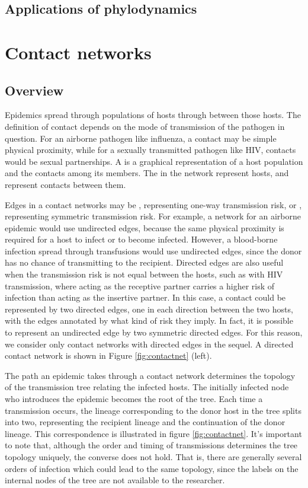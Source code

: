 \subsection{Applications of phylodynamics}
\label{subsubsec:appphylo}

\section{Contact networks}
\label{subsec:contactnet}

\subsection{Overview}

Epidemics spread through populations of hosts through  between
those hosts. The definition of contact depends on the mode of transmission of
the pathogen in question. For an airborne pathogen like influenza, a contact
may be simple physical proximity, while for a sexually transmitted pathogen
like HIV, contacts would be sexual partnerships. A  is a
graphical representation of a host population and the contacts among its
members. The  in the network represent hosts, and 
represent contacts between them. 

Edges in a contact networks may be , representing one-way
transmission risk, or , representing symmetric transmission
risk. For example, a network for an airborne epidemic would use undirected
edges, because the same physical proximity is required for a host to infect or
to become infected. However, a blood-borne infection spread through
transfusions would use undirected edges, since the donor has no chance of
transmitting to the recipient. Directed edges are also useful when the
transmission risk is not equal between the hosts, such as with HIV
transmission, where acting as the receptive partner carries a higher risk of
infection than acting as the insertive partner. In this case, a contact could
be represented by two directed edges, one in each direction between the two
hosts, with the edges annotated by what kind of risk they imply. In fact, it is
possible to represent an undirected edge by two symmetric directed edges. For
this reason, we consider only contact networks with directed edges in the
sequel. A directed contact network is shown in Figure \ref{fig:contactnet}
(left).

The path an epidemic takes through a contact network determines the topology of
the transmission tree relating the infected hosts. The initially infected node
who introduces the epidemic becomes the root of the tree. Each time a
transmission occurs, the lineage corresponding to the donor host in the tree
splits into two, representing the recipient lineage and the continuation of the
donor lineage. This correspondence is illustrated in figure
\ref{fig:contactnet}. It's important to note that, although the order and
timing of transmissions determines the tree topology uniquely, the converse
does not hold. That is, there are generally several orders of infection which
could lead to the same topology, since the labels on the internal nodes of the
tree are not available to the researcher.


